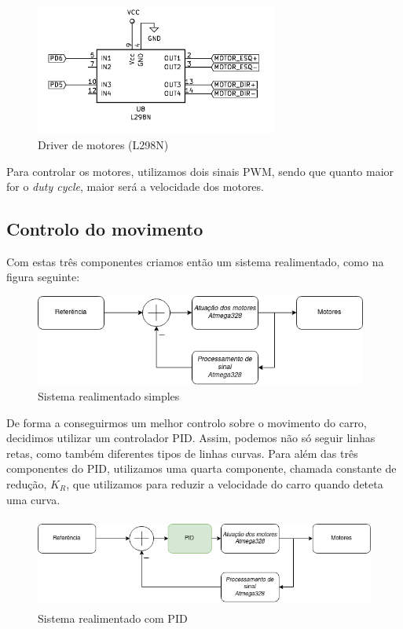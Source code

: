 \documentclass[]{report}
\begin{document}
\begin{figure}[!htb]
	\centering
	\includegraphics[width=8cm]{imagens/driver}
	\caption{Driver de motores (L298N)}
\end{figure}

Para controlar os motores, utilizamos dois sinais PWM, sendo que quanto maior for o \textit{duty cycle}, maior será a velocidade dos motores.

\subsection*{Controlo do movimento}
Com estas três componentes criamos então um sistema realimentado, como na figura seguinte:


\begin{figure}[!htb]
	\centering
	\includegraphics[height=3cm]{imagens/real}
	\caption{Sistema realimentado simples}
\end{figure}

De forma a conseguirmos um melhor controlo sobre o movimento do carro, decidimos utilizar um controlador PID. Assim, podemos não só seguir linhas retas, como também diferentes tipos de linhas curvas. Para além das três componentes do PID, utilizamos uma quarta componente, chamada constante de redução, $K_R$, que utilizamos para reduzir a velocidade do carro quando deteta uma curva.

\begin{figure}[!htb]
	\centering
	\includegraphics[height=3cm]{imagens/real_pid}
	\caption{Sistema realimentado com PID}
\end{figure}
\end{document}
